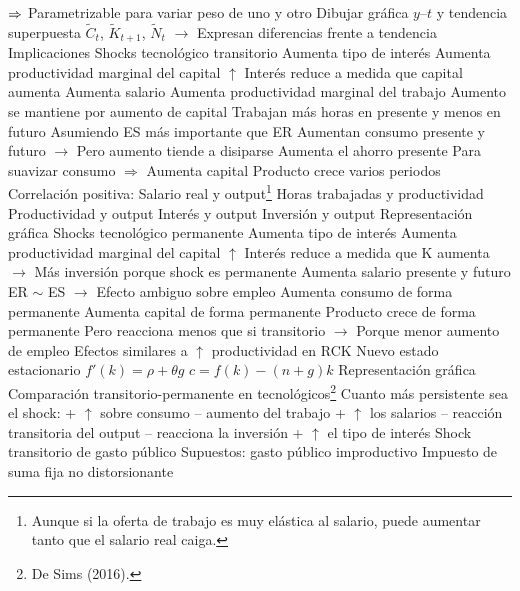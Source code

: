 \documentclass{nuevotema}
\begin{document}
\begin{esquemal}
				\4[] $\Rightarrow$ Parametrizable para variar peso de uno y otro
				\4[] Dibujar gráfica $y$--$t$ y tendencia superpuesta
				\4[] $\tilde{C}_t$, $\tilde{K}_{t+1}$, $\tilde{N}_t$
				\4[] $\to$ Expresan diferencias frente a tendencia
		\2 Implicaciones
			\3 Shocks tecnológico transitorio
				\4 Aumenta tipo de interés
				\4[] Aumenta productividad marginal del capital
				\4[] $\uparrow$ Interés reduce a medida que capital aumenta
				\4 Aumenta salario
				\4[] Aumenta productividad marginal del trabajo
				\4[] Aumento se mantiene por aumento de capital
				\4 Trabajan más horas en presente y menos en futuro
				\4[] Asumiendo ES más importante que ER
				\4 Aumentan consumo presente y futuro
				\4[] $\to$ Pero aumento tiende a disiparse
				\4 Aumenta el ahorro presente
				\4[] Para suavizar consumo
				\4[] $\Rightarrow$ Aumenta capital
				\4 Producto crece varios periodos
				\4[$\Rightarrow$] Correlación positiva:
				\4[] Salario real y output\footnote{Aunque si la oferta de trabajo es muy elástica al salario, puede aumentar tanto que el salario real caiga.}
				\4[] Horas trabajadas y productividad
				\4[] Productividad y output
				\4[] Interés y output
				\4[] Inversión y output
				\4 Representación gráfica
				\4[] 
			\3 Shocks tecnológico permanente
				\4 Aumenta tipo de interés
				\4[] Aumenta productividad marginal del capital
				\4[] $\uparrow$ Interés reduce a medida que K aumenta
				\4[] $\to$ Más inversión porque shock es permanente
				\4 Aumenta salario presente y futuro
				\4[] ER $\sim$ ES $\to$ Efecto ambiguo sobre empleo
				\4 Aumenta consumo de forma permanente
				\4 Aumenta capital de forma permanente
				\4 Producto crece de forma permanente
				\4[] Pero reacciona menos que si transitorio
				\4[] $\to$ Porque menor aumento de empleo
				\4 Efectos similares a $\uparrow$ productividad en RCK
				\4[] Nuevo estado estacionario
				\4[] $f'(k) = \rho + \theta g$
				\4[] $c=f(k) -(n+g)k$
				\4 Representación gráfica
				\4[] 
			\3 Comparación transitorio-permanente en tecnológicos\footnote{De Sims (2016).}
				\4 Cuanto más persistente sea el shock:
				\4[Consumo] + $\uparrow$ sobre consumo
				\4[Tratajo] -- aumento del trabajo
				\4[Salarios] + $\uparrow$ los salarios
				\4[Output] -- reacción transitoria del output
				\4[Inversión] -- reacciona la inversión
				 + $\uparrow$ el tipo de interés
			\3 Shock transitorio de gasto público
				\4 Supuestos:
				\4[] gasto público improductivo
				\4[] Impuesto de suma fija no distorsionante

\end{esquemal}
\end{document}
